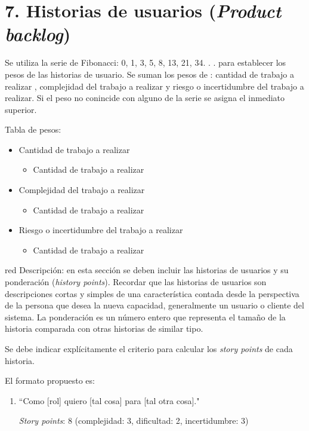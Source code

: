 \documentclass[
11pt, %
codirector, %
]{charter}
\begin{document}
\section{7. Historias de usuarios (\textit{Product backlog})}
\label{sec:backlog}
Se utiliza la serie de Fibonacci: 0, 1, 3, 5, 8, 13, 21, 34. . . para establecer los pesos de las historias
de usuario. Se suman los pesos de : cantidad de trabajo a realizar , complejidad del trabajo a
realizar y riesgo o incertidumbre del trabajo a realizar. Si el peso no conincide con alguno de la
serie se asigna el inmediato superior.

Tabla de pesos:
\begin{itemize}
	\item Cantidad de trabajo a realizar 
	\begin{itemize}
		\item Cantidad de trabajo a realizar 
	\end{itemize}
	\item Complejidad del trabajo a realizar
	\begin{itemize}
		\item Cantidad de trabajo a realizar 
	\end{itemize}
	\item Riesgo o incertidumbre del trabajo a realizar
	\begin{itemize}
		\item Cantidad de trabajo a realizar 
	\end{itemize}
\end{itemize}


\begin{consigna}{red}
Descripción: en esta sección se deben incluir las historias de usuarios y su ponderación (\textit{history points}). Recordar que las historias de usuarios son descripciones cortas y simples de una característica contada desde la perspectiva de la persona que desea la nueva capacidad, generalmente un usuario o cliente del sistema. La ponderación es un número entero que representa el tamaño de la historia comparada con otras historias de similar tipo.

Se debe indicar explícitamente el criterio para calcular los \textit{story points} de cada historia.

El formato propuesto es: 
\begin{enumerate}
\item ``Como [rol] quiero [tal cosa] para [tal otra cosa]."

\textit{Story points}: 8 (complejidad: 3, dificultad: 2, incertidumbre: 3)
\end{enumerate}
\end{consigna}
\end{document}
